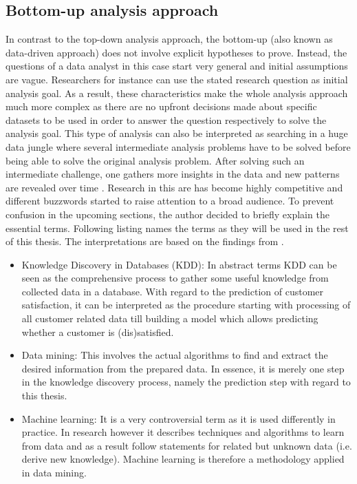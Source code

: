 \subsection{Bottom-up analysis approach}
\label{ssec:bottomUp}
In contrast to the top-down analysis approach, the bottom-up (also known as data-driven approach) does not involve explicit hypotheses to prove. Instead, the questions of a data analyst in this case start very general and initial assumptions are vague. Researchers for instance can use the stated research question as initial analysis goal. As a result, these characteristics make the whole analysis approach much more complex as there are no upfront decisions made about specific datasets to be used in order to answer the question respectively to solve the analysis goal. This type of analysis can also be interpreted as searching in a huge data jungle where several intermediate analysis problems have to be solved before being able to solve the original analysis problem. After solving such an intermediate challenge, one gathers more insights in the data and new patterns are revealed over time \cite{neckel2015} \cite{fayyad1996data}. Research in this are has become highly competitive and different buzzwords started to raise attention to a broad audience. To prevent confusion in the upcoming sections, the author decided to briefly explain the essential terms. Following listing names the terms as they will be used in the rest of this thesis. The interpretations are based on the findings from \cite{fayyad1996data}. 

\begin{itemize}
	\item Knowledge Discovery in Databases (KDD): In abstract terms KDD can be seen as the comprehensive process to gather some useful knowledge from collected data in a database. With regard to the prediction of customer satisfaction, it can be interpreted as the procedure starting with processing of all customer related data till building a model which allows predicting whether a customer is (dis)satisfied.
	\item Data mining: This involves the actual algorithms to find and extract the desired information from the prepared data. In essence, it is merely one step in the knowledge discovery process, namely the prediction step with regard to this thesis. 
	\item Machine learning: It is a very controversial term as it is used differently in practice. In research however it describes techniques and algorithms to learn from data and as a result follow statements for related but unknown data (i.e. derive new knowledge). Machine learning is therefore a methodology applied in data mining. 
\end{itemize}


